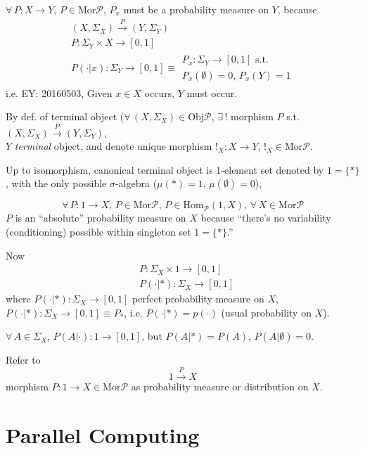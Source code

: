 \documentclass[10pt]{amsart}
\begin{document}
\begin{multicols*}{2}
$\forall \, P:X\to Y$, $P \in \text{Mor}\mathcal{P}$, $P_x$ must be a probability measure on $Y$, because 
\[
\begin{gathered}
  (X,\Sigma_X) \xrightarrow{ P } (Y,\Sigma_Y) \\ 
  P:\Sigma_Y\times X \to [0,1] \\ 
  P(\cdot | x):\Sigma_Y \to [0,1] \equiv \begin{gathered} P_x:\Sigma_Y \to [0,1]  \text{ s.t. }  \\ P_x(\emptyset) =0, \, P_x(Y) =1 \end{gathered}
\end{gathered}
\]
i.e. EY: 20160503, Given $x\in X$ occurs, $Y$ must occur. 

By def. of terminal object ($\forall \, (X,\Sigma_X) \in \text{Obj}\mathcal{P}$, $\exists \, !$ morphism $P$ s.t. $(X,\Sigma_X) \xrightarrow{P} (Y,\Sigma_Y)$, \\
$Y$ \emph{terminal} object, and denote unique morphism $!_X : X\to Y$, $!_X \in \text{Mor}\mathcal{P}$.  

Up to isomorphism, canonical terminal object is 1-element set denoted by $1 = \lbrace * \rbrace$, with the only possible $\sigma$-algebra ($\mu(*)=1, \, \mu(\emptyset) = 0$),

\[
\forall \, P:1 \to X, \, P\in \text{Mor}\mathcal{P}, \, P \in \text{Hom}_{\mathcal{P}}(1,X) , \, \forall \, X \in \text{Mor}\mathcal{P}
\]
$P$ is an ``absolute'' probability measure on $X$ because ``there's no variability (conditioning) possible within singleton set $1 = \lbrace * \rbrace$.''  \cite{CS2013}

Now
\[
\begin{aligned}
  & P:\Sigma_X \times 1 \to [0,1] \\ 
  & P(\cdot | *) : \Sigma_X \to [0,1]
\end{aligned}
\]
where $P(\cdot | *) : \Sigma_X \to [0,1]$ perfect probability measure on $X$, $P(\cdot | *) : \Sigma_X \to [0,1] \equiv P_*$, i.e. $P(\cdot | *) = p(\cdot )$ (usual probability on $X$).  

$\forall \, A \in \Sigma_X$, $P(A|\cdot ) : 1 \to [ 0,1]$, but $P(A|*) = P(A)$, $P(A|\emptyset ) = 0$.  

Refer to 
\[
1\xrightarrow{P} X
\]
morphism $P:1\to X \in \text{Mor}\mathcal{P}$ as probability measure or distribution on $X$.  




\section{Parallel Computing}


\end{multicols*}
\end{document}
